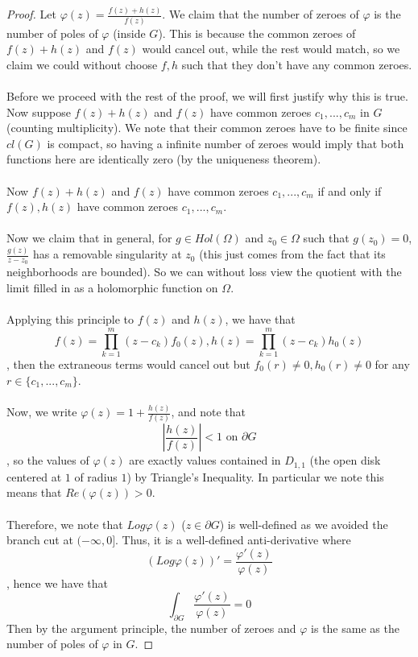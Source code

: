 \documentclass{article}
\begin{document}
\begin{proof}
Let $\varphi(z) = \frac{f(z) + h(z)}{f(z)}$. We claim that the number of zeroes of $\varphi$ is the number of poles of $\varphi$ (inside $G$). This is because the common zeroes of $f(z) + h(z)$ and $f(z)$ would cancel out, while the rest would match, so we claim we could without choose $f, h$ such that they don't have any common zeroes.\\\\
Before we proceed with the rest of the proof, we will first justify why this is true. 
Now suppose $f(z) + h(z)$ and $f(z)$ have common zeroes $c_1, ..., c_m$ in $G$ (counting multiplicity). We note that their common zeroes have to be finite since $cl(G)$ is compact, so having a infinite number of zeroes would imply that both functions here are identically zero (by the uniqueness theorem).\\\\
Now $f(z) + h(z)$ and $f(z)$ have common zeroes $c_1, ..., c_m$ if and only if $f(z), h(z)$ have common zeroes $c_1, ..., c_m$.\\\\
Now we claim that in general, for $g \in Hol(\Omega)$ and $z_0 \in \Omega$ such that $g(z_0) = 0$, $\frac{g(z)}{z - z_0}$ has a removable singularity at $z_0$ (this just comes from the fact that its neighborhoods are bounded). So we can without loss view the quotient with the limit filled in as a holomorphic function on $\Omega$.\\\\
Applying this principle to $f(z)$ and $h(z)$, we have that
\[f(z) = \prod_{k = 1}^m (z - c_k) f_0(z), h(z) = \prod_{k = 1}^m (z - c_k) h_0(z)\]
, then the extraneous terms would cancel out but $f_0(r) \neq 0, h_0(r) \neq 0$ for any $r \in \{c_1, ..., c_m\}$.\\\\
Now, we write $\varphi(z) = 1 + \frac{h(z)}{f(z)}$, and note that
\[|\frac{h(z)}{f(z)}| < 1 \text{ on $\partial G$}\]
, so the values of $\varphi(z)$ are exactly values contained in $D_{1, 1}$ (the open disk centered at $1$ of radius $1$) by Triangle's Inequality. In particular we note this means that $Re(\varphi(z)) > 0$.\\\\
Therefore, we note that $Log \varphi(z)$ ($z \in \partial G$) is well-defined as we avoided the branch cut at $(-\infty, 0]$. Thus, it is a well-defined anti-derivative where
\[(Log \varphi(z))' = \frac{\varphi'(z)}{\varphi(z)}\]
, hence we have that
\[\int_{\partial G} \frac{\varphi'(z)}{\varphi(z)} = 0\]
Then by the argument principle, the number of zeroes and $\varphi$ is the same as the number of poles of $\varphi$ in $G$.
\end{proof}
\end{document}
